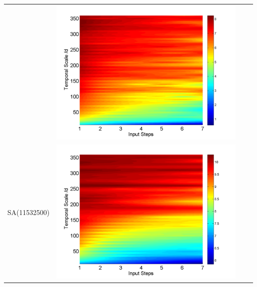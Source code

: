 \documentclass[draft,wrr]{AGUTeX}
\begin{document}
\begin{article}
\begin{table}[H]
\begin{tabular}{cccc}
&\begin{minipage}{.3\textwidth}\includegraphics[width=\linewidth]{resultgraph/05585000pepq_abs.png}\end{minipage}
\\
SA(11532500)
&\begin{minipage}{.3\textwidth}\includegraphics[width=\linewidth]{resultgraph/11532500p_abs.png}\end{minipage}

\end{tabular}
\end{table}
\end{article}
\end{document}
